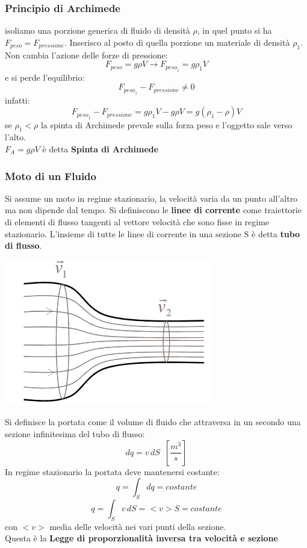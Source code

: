 \documentclass[a4paper,12pt, oneside]{book}
\begin{document}
\subsubsection{Principio di Archimede}
isoliamo una porzione generica di fluido di densità $\rho$, in quel punto si ha $F_{peso}=F_{pressione}$. Inserisco al posto di quella porzione un materiale di densità $\rho_1$. Non cambia l'azione delle forze di pressione:
$$F_{peso}=g\rho V\to F_{{peso}_1}=g\rho_1 V$$
e si perde l'equilibrio:
$$F_{{peso}_1}-F_{pressione}\neq 0$$
infatti:
$$F_{{peso}_1}-F_{pressione}=g\rho_1V-g\rho V=g(\rho_1-\rho)V$$
se $\rho_1<\rho$ la spinta di Archimede prevale sulla forza peso e l'oggetto sale verso l'alto. \\
$F_A=g\rho V$ è detta \textbf{Spinta di Archimede}
\subsubsection{Moto di un Fluido}
Si assume un moto in regime stazionario, la velocità varia da un punto all'altro ma non dipende dal tempo. Si definiscono le \textbf{linee di corrente} come traiettorie di elementi di flusso tangenti al vettore velocità che sono fisse in regime stazionario. L'insieme di tutte le linee di corrente in una sezione S è detta \textbf{tubo di flusso}.
\begin{center}
	\includegraphics[scale=0.5]{img/flu5.png}
\end{center}
Si definisce la portata come il volume di fluido che attraversa in un secondo una sezione infinitesima del tubo di flusso:
$$dq=v\,dS\,\,\,\left[\frac{m^3}{s}\right]$$
In regime stazionario la portata deve mantenersi costante:
$$q=\int_S dq=costante$$
$$q=\int_S v\,dS=<v>S=costante$$
con $<v>$ media delle velocità nei vari punti della sezione.\\
Questa è la \textbf{Legge di proporzionalità inversa tra velocità e sezione}
\end{document}

